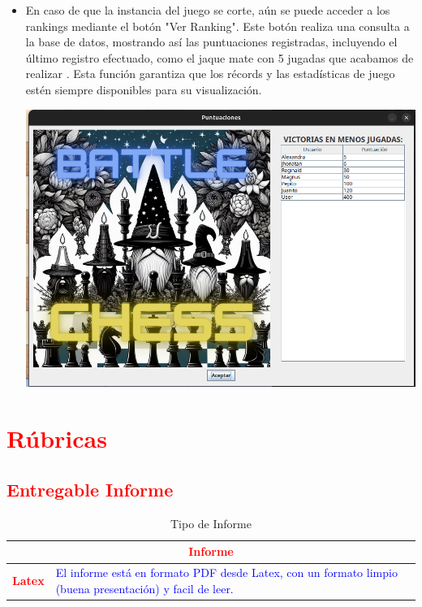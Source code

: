 \documentclass{article}
\begin{document}
\begin{itemize}
\item En caso de que la instancia del juego se corte, aún se puede acceder a los rankings mediante el botón "Ver Ranking". Este botón realiza una consulta a la base de datos, mostrando así las puntuaciones registradas, incluyendo el último registro efectuado, como el jaque mate con 5 jugadas que acabamos de realizar . Esta función garantiza que los récords y las estadísticas de juego estén siempre disponibles para su visualización.
\begin{center}
    \includegraphics[width=16cm]{latex/img/6.png}
\end{center}



   \end{itemize}





	\section{\textcolor{red}{Rúbricas}}
	
	\subsection{\textcolor{red}{Entregable Informe}}
	\begin{table}[H]
		\caption{Tipo de Informe}
		\setlength{\tabcolsep}{0.5em} %
		{\renewcommand{\arraystretch}{1.5}%
		\begin{tabular}{|p{3cm}|p{12cm}|}
			\hline
			\multicolumn{2}{|c|}{\textbf{\textcolor{red}{Informe}}}  \\
			\hline 
			\textbf{\textcolor{red}{Latex}} & \textcolor{blue}{El informe está en formato PDF desde Latex,  con un formato limpio (buena presentación) y facil de leer.}   \\ 
			\hline 
			
			
		\end{tabular}
	}
	\end{table}
\end{document}
